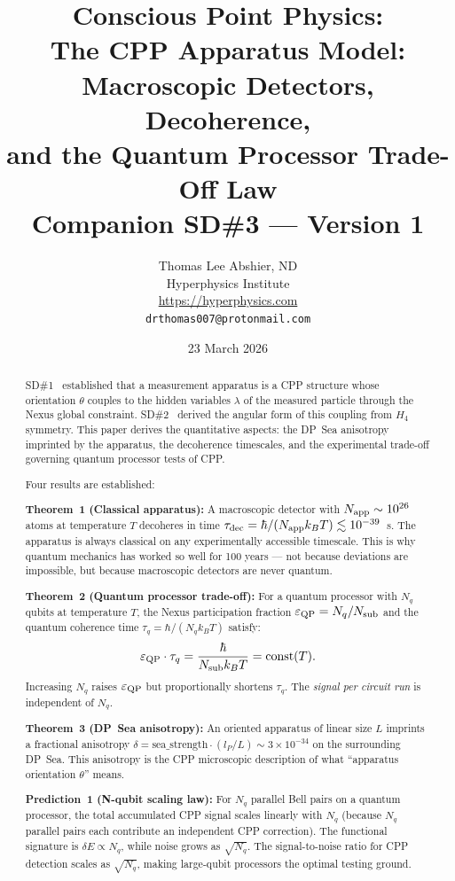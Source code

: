 \documentclass[11pt,letterpaper]{article}
\title{\textbf{Conscious Point Physics:\\
The CPP Apparatus Model:\\
Macroscopic Detectors, Decoherence,\\
and the Quantum Processor Trade-Off Law}\\[6pt]
{\large Companion SD\#3 --- Version 1}}
\author{Thomas Lee Abshier, ND\\
Hyperphysics Institute\\
\url{https://hyperphysics.com}\\
\texttt{drthomas007@protonmail.com}}
\date{23 March 2026}
\newcommand{\lP}{l_P}
\newcommand{\eps}{\varepsilon}
\begin{document}
\maketitle

\begin{abstract}
SD\#1~\citep{cpp_sd1} established that a measurement apparatus is a
CPP structure whose orientation $\theta$ couples to the hidden
variables $\lambda$ of the measured particle through the Nexus global
constraint.  SD\#2~\citep{cpp_sd2} derived the angular form of this
coupling from $H_4$ symmetry.  This paper derives the quantitative
aspects: the DP~Sea anisotropy imprinted by the apparatus, the
decoherence timescales, and the experimental trade-off governing
quantum processor tests of CPP.

Four results are established:

\textbf{Theorem~1 (Classical apparatus):}
A macroscopic detector with $N_{\rm app} \sim 10^{26}$ atoms at
temperature $T$ decoheres in time $\tau_{\rm dec} = \hbar /
(N_{\rm app} k_B T) \lesssim 10^{-39}$~s.  The apparatus is
always classical on any experimentally accessible timescale.
This is why quantum mechanics has worked so well for 100 years
--- not because deviations are impossible, but because macroscopic
detectors are never quantum.

\textbf{Theorem~2 (Quantum processor trade-off):}
For a quantum processor with $N_q$ qubits at temperature $T$,
the Nexus participation fraction $\eps_{\rm QP} = N_q / N_{\rm sub}$
and the quantum coherence time $\tau_q = \hbar/(N_q k_B T)$
satisfy:
\begin{equation*}
\eps_{\rm QP} \cdot \tau_q
= \frac{\hbar}{N_{\rm sub} k_B T} = \text{const}(T).
\end{equation*}
Increasing $N_q$ raises $\eps_{\rm QP}$ but proportionally shortens
$\tau_q$.  The \emph{signal per circuit run} is independent of $N_q$.

\textbf{Theorem~3 (DP~Sea anisotropy):}
An oriented apparatus of linear size $L$ imprints a fractional
anisotropy $\delta = \text{sea\_strength} \cdot (\lP/L) \sim 3
\times 10^{-34}$ on the surrounding DP~Sea.  This anisotropy is
the CPP microscopic description of what ``apparatus orientation
$\theta$'' means.

\textbf{Prediction~1 (N-qubit scaling law):}
For $N_q$ parallel Bell pairs on a quantum processor, the total
accumulated CPP signal scales linearly with $N_q$ (because $N_q$
parallel pairs each contribute an independent CPP correction).
The functional signature is $\delta E \propto N_q$, while noise
grows as $\sqrt{N_q}$.  The signal-to-noise ratio for CPP detection
scales as $\sqrt{N_q}$, making large-qubit processors the
optimal testing ground.
\end{abstract}
\end{document}

